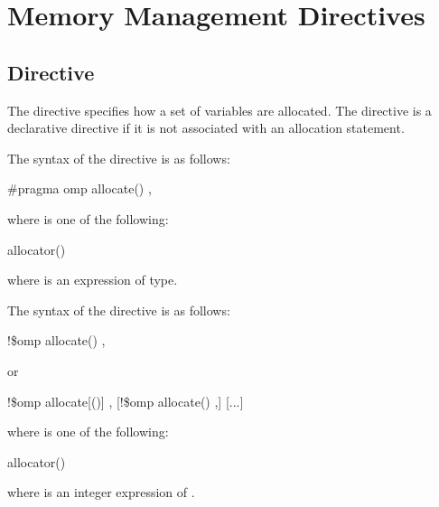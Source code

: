 \section{Memory Management Directives}
\label{sec:Memory Management Directives}


\subsection{ Directive}
\label{subsec:allocate Directive}
\summary

The  directive specifies how a set of variables are allocated. The  directive is a declarative directive if it is not associated with an allocation statement.

\syntax
\begin{ccppspecific}
The syntax of the  directive is as follows:

\begin{boxedcode}
\#pragma omp allocate() \plc{[clause[ [ [},\plc{] clause] ... ]] new-line}
\end{boxedcode}

where  is one of the following:

\begin{indentedcodelist}
allocator()
\end{indentedcodelist}

where  is an expression of  type.

\end{ccppspecific}
\medskip

\begin{fortranspecific}
The syntax of the  directive is as follows:

\begin{boxedcode}
!\$omp allocate() \plc{[clause[ [ [},\plc{] clause] ... ]]}
\end{boxedcode}

or
\begin{boxedcode}
!\$omp allocate[()] \plc{clause[ [ [},\plc{] clause] ... ]}
[!\$omp allocate() \plc{clause[ [ [},\plc{] clause] ... ]}]
[...]
\end{boxedcode}

where  is one of the following:

\begin{indentedcodelist}
allocator()
\end{indentedcodelist}

where  is an integer expression of  .

\end{fortranspecific}

